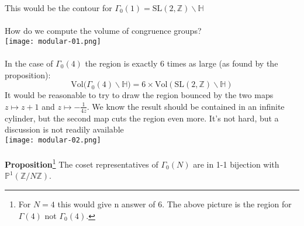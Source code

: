 \documentclass[12pt]{article}
\begin{document}
\noindent This would be the contour for $\Gamma_0(1) = \text{SL}(2, \mathbb{Z}) \backslash \mathbb{H}$ \\\\
How do we compute the volume of congruence groups?\\
\texttt{[image: modular-01.png]} \\ \\
In the case of $\Gamma_0(4)$ the region is exactly 6 times as large (as found by the proposition):
$$ \text{Vol} \big( \Gamma_0(4) \backslash \mathbb{H}\big) = 6 \times \text{Vol} ( \text{SL}(2, \mathbb{Z}) \backslash \mathbb{H}) $$
It would be reasonable to try to draw the region bounced by the two maps $z \mapsto z + 1$ and $z \mapsto - \frac{1}{4z}$.  We know the result should be contained in an infinite cylinder, but the second map cuts the region even more.  It's not hard, but a discussion is not readily available \\ 
\texttt{[image: modular-02.png]} \\ \\
\textbf{Proposition}\footnote{For $N = 4$ this would give n answer of $6$.  The above picture is the region for $\Gamma(4)$ not $\Gamma_0(4)$. } The coset representatives of $\Gamma_0(N)$ are in 1-1 bijection with $\mathbb{P}^1(\mathbb{Z}/ N \mathbb{Z})$. 


\newpage
\end{document}
